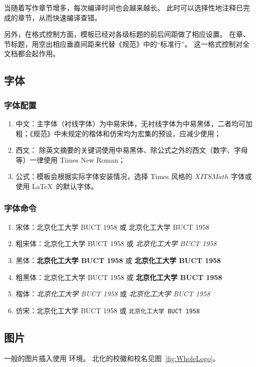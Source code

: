 当随着写作章节增多，每次编译时间也会越来越长。
此时可以选择性地注释已完成的章节，从而快速编译查错。

另外，在格式控制方面，模板已经对各级标题的前后间距做了相应设置。
在章、节标题，用空出相应垂直间距来代替《规范》中的“标准行”。
这一格式控制对全文档都会起作用。
\subsection{字体}
\subsubsection{字体配置}
\begin{enumerate}
	\item 中文：主字体（衬线字体）为中易宋体，无衬线字体为中易黑体，二者均可加粗；《规范》中未规定的楷体和仿宋均为宏集的预设，应减少使用；
	\item 西文： 除英文摘要的关键词使用中易黑体、除公式之外的西文（数字、字母等）一律使用 Times New Roman；
	\item 公式：模板会根据实际字体安装情况，选择 Times 风格的 $XITSMath$ 字体或使用 \LaTeX\ 的默认字体。
\end{enumerate}

\subsubsection{字体命令}
\begin{enumerate}
	\item 宋体：北京化工大学 BUCT 1958 或 \textrm{北京化工大学 BUCT 1958}
	\item 粗宋体：{\bfsong 北京化工大学 BUCT 1958} 或 \emph{北京化工大学 BUCT 1958}
	\item 黑体：{\bfseries 北京化工大学 BUCT 1958} 或 \textbf{北京化工大学 BUCT 1958}
	\item 粗黑体：{\bfhei 北京化工大学 BUCT 1958} 或 \textbf{\heiti 北京化工大学 BUCT 1958}
	\item 楷体：{\itshape 北京化工大学 BUCT 1958} 或 \textit{北京化工大学 BUCT 1958}
	\item 仿宋：{\ttfamily 北京化工大学 BUCT 1958} 或 \texttt{北京化工大学 BUCT 1958}
\end{enumerate}
\subsection{图片}\label{subsec:fig}
一般的图片插入使用  环境。
北化的校徽和校名见图~\ref{fig:WholeLogo}。

